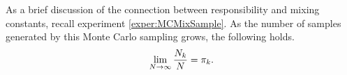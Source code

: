As a brief discussion of the connection between responsibility and mixing 
constants, recall experiment \ref{exper:MCMixSample}.   
As the number of samples generated by this Monte Carlo sampling grows, the following holds. \[\lim_{N\rightarrow\infty}\frac{N_k}{N} = \pi_k.\] 

